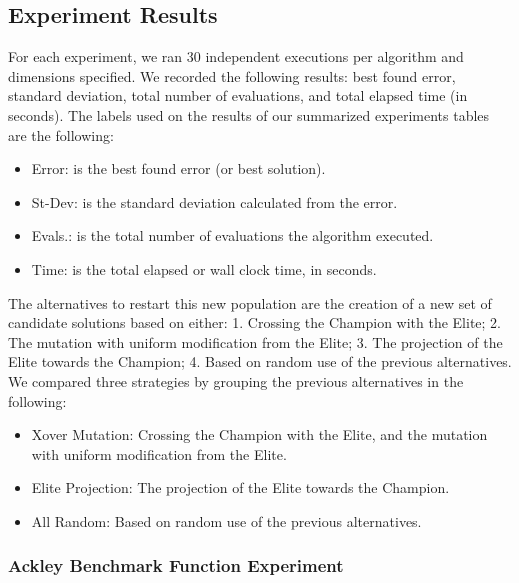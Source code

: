\documentclass[graybox]{svmult}
\begin{document}
        \FloatBarrier


    \subsection{Experiment Results}

        For each experiment, we ran 30 independent executions per algorithm and
        dimensions specified. We recorded the following results: best found error,
        standard deviation, total number of evaluations, and total elapsed time (in
        seconds). The labels used on the results of our summarized experiments tables
        are the following:

        \begin{itemize}
            \item   Error:       is the best found error (or best solution).
            \item   St-Dev:      is the standard deviation calculated from the error. 
            \item   Evals.:      is the total number of evaluations the algorithm executed.
            \item   Time:        is the total elapsed or wall clock time, in seconds. 
        \end{itemize}

        The alternatives to restart this new population are the creation of a new set
        of candidate solutions based on either: 1. Crossing the Champion with the Elite;
        2. The mutation with uniform modification from the Elite; 3. The
        projection of the Elite towards the Champion; 4. Based on random use of the
        previous alternatives. We compared three strategies by grouping the previous
        alternatives in the following:

        \begin{itemize}
            \item   Xover Mutation:      Crossing the Champion with the Elite, and the mutation with uniform modification from the Elite.
            \item   Elite Projection:    The projection of the Elite towards the Champion. 
            \item   All Random:          Based on random use of the previous alternatives.
        \end{itemize}

        \subsubsection{Ackley Benchmark Function Experiment}
\end{document}
